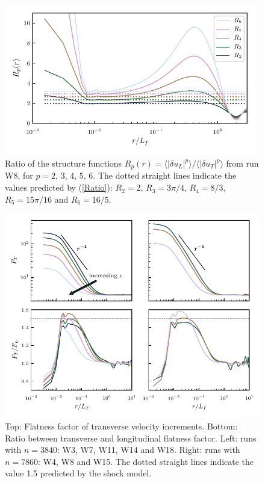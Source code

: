 \documentclass{jfm}
\newcommand{\mean}[1]{\langle #1 \rangle}
\begin{document}
\begin{figure}
\centerline{\includegraphics[width=11cm]{../Pyfig/fig_ratio_strfct}}
\caption{
Ratio of the structure functions
$R_p(r) = \mean{|\delta u_L|^p} / \mean{|\delta u_T|^p}$ from run W8,
for $ p = 2, \, 3, \, 4, \, 5, \, 6. $
The dotted straight lines indicate the values predicted by (\ref{Ratio}):
$R_2 = 2$, $R_3 = 3\pi/4$,  $R_4 = 8/3$, $ R_5 = 15 \pi /16 $ and $ R_6 = 16/5 $.}
\label{fig_ratio}
\end{figure}

\begin{figure}
\centerline{\includegraphics[width=12cm]{../Pyfig/fig_flatness}}
\caption{ Top: Flatness factor of transverse velocity increments. Bottom: Ratio between transverse and longitudinal flatness factor. Left: runs with $ n=3840 $: W3,
W7, W11,  W14 and W18. Right: runs with $ n = 7860 $: W4, W8 and W15.  The dotted straight lines indicate the value 1.5 predicted by the shock model.  }
\label{fig_flatness}
\end{figure}
\end{document}
